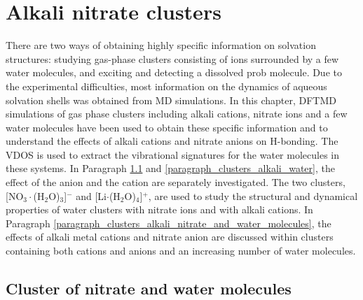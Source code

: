   \chapter{Alkali nitrate clusters}\label{CHAPTER_Clusters}
There are two ways of obtaining highly specific information on solvation structures: studying gas-phase clusters consisting of ions surrounded by a few water molecules\cite{Weber2000,Kropman2001},
and exciting and detecting a dissolved prob molecule\cite{Jimenez1994}.
Due to the experimental difficulties, most information on the dynamics of aqueous solvation shells was obtained from MD simulations\cite{Smith1994,Chandra2000}.
  In this chapter, DFTMD simulations of gas phase clusters including alkali cations, nitrate ions and a few water molecules have been used to obtain these specific information and to understand the
  effects of alkali cations and nitrate anions on H-bonding\cite{jiangling2010,heine2015}. 
  The VDOS is used to extract the vibrational signatures for the water molecules in these systems.
  In Paragraph \ref{paragraph_3w_nitrate} and \ref{paragraph_clusters_alkali_water}, 
  the effect of the anion and the cation are separately investigated. 
  The two clusters, [NO$_3\cdot$(H$_2$O)$_3$]$^-$ and [Li$\cdot$(H$_2$O)$_4$]$^+$, are used 
  to study the structural and dynamical properties of water clusters with nitrate ions and with alkali cations. 
  In Paragraph \ref{paragraph_clusters_alkali_nitrate_and_water_molecules}, the effects of alkali metal cations 
  and nitrate anion are discussed within clusters containing both cations and anions and an increasing number of water molecules.
  \section{Cluster of nitrate and water molecules}\label{paragraph_3w_nitrate}
  
